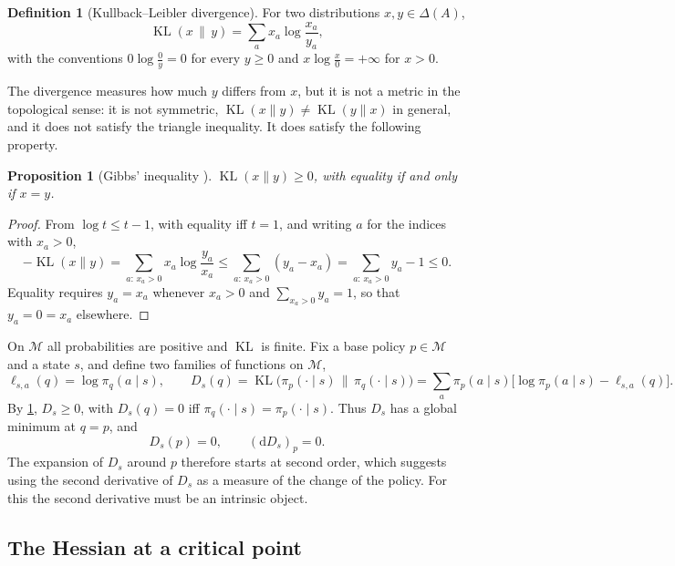 \documentclass[11pt,a4paper]{article}
\numberwithin{equation}{section}
\theoremstyle{plain}
\newtheorem{proposition}[theorem]{Proposition}
\theoremstyle{definition}
\newtheorem{definition}[theorem]{Definition}
\theoremstyle{remark}
\newcommand{\dd}{\mathrm{d}}
\DeclareMathOperator{\KL}{KL}
\newcommand{\mani}{\mathcal{M}}
\begin{document}
\begin{definition}[Kullback--Leibler divergence]\label{def:kl}
For two distributions $x,y\in\Delta(A)$,
\begin{equation}\label{eq:kl}
  \KL(x\,\|\,y)=\sum_{a}x_a\log\frac{x_a}{y_a},
\end{equation}
with the conventions $0\log\frac0y=0$ for every $y\ge0$ and $x\log\frac x0=+\infty$ for $x>0$.
\end{definition}

The divergence measures how much $y$ differs from $x$, but it is not a metric in the topological sense: it is not symmetric,
$\KL(x\|y)\ne\KL(y\|x)$ in general, and it does not satisfy the triangle inequality. It does satisfy the following property.

\begin{proposition}[Gibbs' inequality \cite{gibbs}]\label{prop:gibbs}
$\KL(x\|y)\ge0$, with equality if and only if $x=y$.
\end{proposition}

\begin{proof}
From $\log t\le t-1$, with equality iff $t=1$, and writing $a$ for the indices with $x_a>0$,
\[
  -\KL(x\|y)=\sum_{a:\,x_a>0}x_a\log\frac{y_a}{x_a}
  \le\sum_{a:\,x_a>0}(y_a-x_a)=\sum_{a:\,x_a>0}y_a-1\le0 .
\]
Equality requires $y_a=x_a$ whenever $x_a>0$ and $\sum_{x_a>0}y_a=1$, so that $y_a=0=x_a$ elsewhere. \qedhere
\end{proof}

On $\mani$ all probabilities are positive and $\KL$ is finite. Fix a base policy $p\in\mani$ and a state $s$, and define two families of
functions on $\mani$,
\begin{equation}\label{eq:ell-D}
  \ell_{s,a}(q)=\log\pi_q(a\mid s),
  \qquad
  D_s(q)=\KL\bigl(\pi_p(\cdot\mid s)\,\big\|\,\pi_q(\cdot\mid s)\bigr)
  =\sum_a\pi_p(a\mid s)\bigl[\log\pi_p(a\mid s)-\ell_{s,a}(q)\bigr].
\end{equation}
By \cref{prop:gibbs}, $D_s\ge0$, with $D_s(q)=0$ iff $\pi_q(\cdot\mid s)=\pi_p(\cdot\mid s)$. Thus $D_s$ has a global minimum at $q=p$, and
\begin{equation}\label{eq:D-critical}
  D_s(p)=0,\qquad(\dd D_s)_p=0 .
\end{equation}
The expansion of $D_s$ around $p$ therefore starts at second order, which suggests using the second derivative of $D_s$ as a measure of the change
of the policy. For this the second derivative must be an intrinsic object.

\subsection{The Hessian at a critical point}
\end{document}
